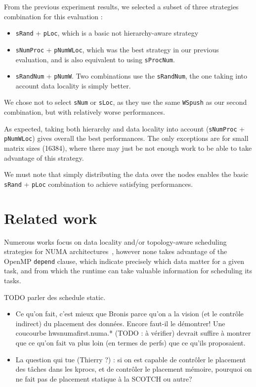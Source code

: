 \documentclass{Styles/llncs}
\begin{document}
From the previous experiment results, we selected a subset of three strategies
combination for this evaluation :
\begin{itemize}
  \item \verb/sRand/ + \verb/pLoc/, which is a basic not hierarchy-aware strategy
  \item \verb/sNumProc/ + \verb/pNumWLoc/, which was the best strategy in our previous
    evaluation, and is also equivalent to using \verb/sProcNum/.
  \item \verb/sRandNum/ + \verb/pNumW/. Two combinations use the \verb/sRandNum/,
    the one taking into account data locality is simply better.
\end{itemize}
We chose not to select \verb/sNum/ or \verb/sLoc/, as they use the same \verb/WSpush/
as our second combination, but with relatively worse performances.

As expected, taking both hierarchy and data locality into account (\verb/sNumProc/
+ \verb/pNumWLoc/) gives overall the best performances.
The only exceptions are for small matrix sizes (16384), where there may just be
not enough work to be able to take advantage of this strategy.

We must note that simply distributing the data over the nodes enables the basic
\verb/sRand/ + \verb/pLoc/ combination to achieve satisfying performances.


\section{Related work}

Numerous works focus on data locality and/or topology-aware scheduling strategies for
NUMA architectures~\cite{DBLP:conf/europar/Clet-OrtegaCP14,DBLP:journals/ijhpca/OlivierPWSP12,Olivier:2012:CMW:2388996.2389085,DBLP:journals/corr/Tahan14,DBLP:conf/europar/TerbovenSCM12,DBLP:journals/corr/abs-1101-0093}, however none takes advantage of the OpenMP \verb/depend/ clause,
which indicate precisely which data matter for a given task, and from which
the runtime can take valuable information for scheduling its tasks.

TODO parler des schedule static.

\begin{itemize}
\item Ce qu'on fait, c'est mieux que Bronis parce qu'on a la vision
  (et le contrôle indirect) du placement des données. Encore faut-il
  le démontrer! Une coucourbe hwsnumafirst.numa.* (TODO : à vérifier)
  devrait suffire à montrer que ce qu'on fait va plus loin (en termes
  de perfs) que ce qu'ils proposaient.
\item La question qui tue (Thierry ?) : si on est capable de contrôler le
  placement des tâches dans les kprocs, et de contrôler le placement
  mémoire, pourquoi on ne fait pas de placement statique à la SCOTCH
  ou autre?
\end{itemize}
\end{document}
